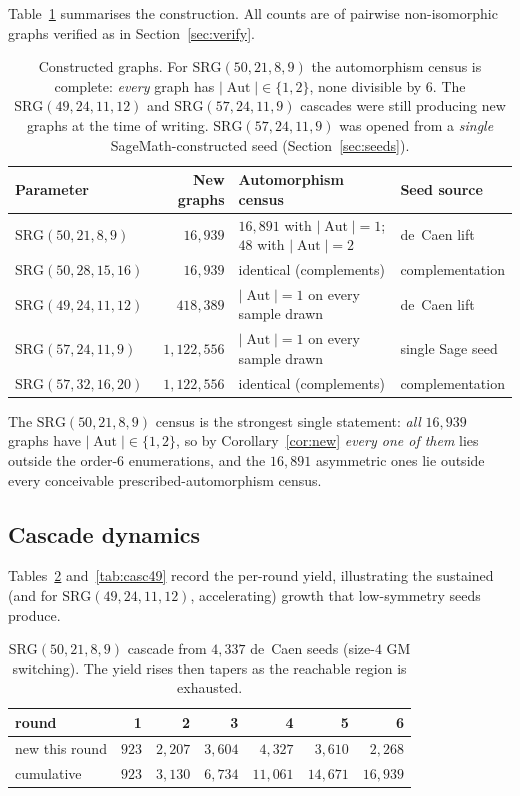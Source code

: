 \documentclass[11pt]{article}
\theoremstyle{definition}
\newcommand{\SRG}[1]{\mathrm{SRG}(#1)}
\newcommand{\Aut}{\operatorname{Aut}}
\begin{document}
Table~\ref{tab:counts} summarises the construction. All counts are of pairwise
non-isomorphic graphs verified as in Section~\ref{sec:verify}.

\begin{table}[h]
\centering
\begin{tabular}{lrll}
\toprule
Parameter & New graphs & Automorphism census & Seed source \\
\midrule
$\SRG{50,21,8,9}$   & $16{,}939$ & $16{,}891$ with $|\Aut|=1$; $48$ with $|\Aut|=2$ & de~Caen lift \\
$\SRG{50,28,15,16}$ & $16{,}939$ & identical (complements) & complementation \\
$\SRG{49,24,11,12}$ & $418{,}389$ & $|\Aut|=1$ on every sample drawn & de~Caen lift \\
$\SRG{57,24,11,9}$  & $1{,}122{,}556$ & $|\Aut|=1$ on every sample drawn & single Sage seed \\
$\SRG{57,32,16,20}$ & $1{,}122{,}556$ & identical (complements) & complementation \\
\bottomrule
\end{tabular}
\caption{Constructed graphs. For $\SRG{50,21,8,9}$ the automorphism census is complete:
\emph{every} graph has $|\Aut|\in\{1,2\}$, none divisible by $6$. The
$\SRG{49,24,11,12}$ and $\SRG{57,24,11,9}$ cascades were still producing new graphs at the
time of writing. $\SRG{57,24,11,9}$ was opened from a \emph{single} SageMath-constructed
seed (Section~\ref{sec:seeds}).}
\label{tab:counts}
\end{table}

The $\SRG{50,21,8,9}$ census is the strongest single statement: \emph{all} $16{,}939$
graphs have $|\Aut|\in\{1,2\}$, so by Corollary~\ref{cor:new} \emph{every one of them}
lies outside the order-$6$ enumerations, and the $16{,}891$ asymmetric ones lie outside
every conceivable prescribed-automorphism census.

\subsection{Cascade dynamics}

Tables~\ref{tab:casc50} and~\ref{tab:casc49} record the per-round yield, illustrating the
sustained (and for $\SRG{49,24,11,12}$, accelerating) growth that low-symmetry seeds
produce.

\begin{table}[h]
\centering
\begin{tabular}{lrrrrrr}
\toprule
round & 1 & 2 & 3 & 4 & 5 & 6 \\
\midrule
new this round & $923$ & $2{,}207$ & $3{,}604$ & $4{,}327$ & $3{,}610$ & $2{,}268$ \\
cumulative & $923$ & $3{,}130$ & $6{,}734$ & $11{,}061$ & $14{,}671$ & $16{,}939$ \\
\bottomrule
\end{tabular}
\caption{$\SRG{50,21,8,9}$ cascade from $4{,}337$ de~Caen seeds (size-$4$ GM switching).
The yield rises then tapers as the reachable region is exhausted.}
\label{tab:casc50}
\end{table}
\end{document}

